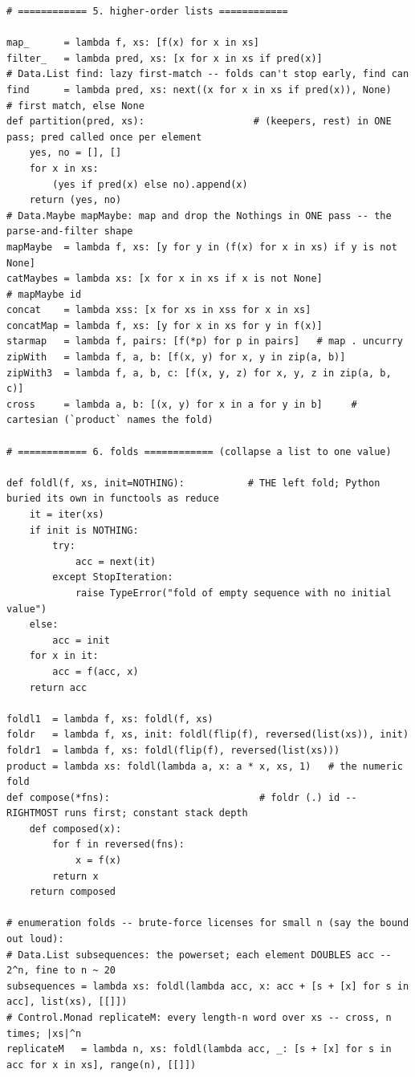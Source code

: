 \documentclass[11pt,letterpaper]{book}
\begin{document}
\begin{lstlisting}[style=file]
# ============ 5. higher-order lists ============

map_      = lambda f, xs: [f(x) for x in xs]
filter_   = lambda pred, xs: [x for x in xs if pred(x)]
# Data.List find: lazy first-match -- folds can't stop early, find can
find      = lambda pred, xs: next((x for x in xs if pred(x)), None)   # first match, else None
def partition(pred, xs):                   # (keepers, rest) in ONE pass; pred called once per element
    yes, no = [], []
    for x in xs:
        (yes if pred(x) else no).append(x)
    return (yes, no)
# Data.Maybe mapMaybe: map and drop the Nothings in ONE pass -- the parse-and-filter shape
mapMaybe  = lambda f, xs: [y for y in (f(x) for x in xs) if y is not None]
catMaybes = lambda xs: [x for x in xs if x is not None]                      # mapMaybe id
concat    = lambda xss: [x for xs in xss for x in xs]
concatMap = lambda f, xs: [y for x in xs for y in f(x)]
starmap   = lambda f, pairs: [f(*p) for p in pairs]   # map . uncurry
zipWith   = lambda f, a, b: [f(x, y) for x, y in zip(a, b)]
zipWith3  = lambda f, a, b, c: [f(x, y, z) for x, y, z in zip(a, b, c)]
cross     = lambda a, b: [(x, y) for x in a for y in b]     # cartesian (`product` names the fold)

# ============ 6. folds ============ (collapse a list to one value)

def foldl(f, xs, init=NOTHING):           # THE left fold; Python buried its own in functools as reduce
    it = iter(xs)
    if init is NOTHING:
        try:
            acc = next(it)
        except StopIteration:
            raise TypeError("fold of empty sequence with no initial value")
    else:
        acc = init
    for x in it:
        acc = f(acc, x)
    return acc

foldl1  = lambda f, xs: foldl(f, xs)
foldr   = lambda f, xs, init: foldl(flip(f), reversed(list(xs)), init)
foldr1  = lambda f, xs: foldl(flip(f), reversed(list(xs)))
product = lambda xs: foldl(lambda a, x: a * x, xs, 1)   # the numeric fold
def compose(*fns):                          # foldr (.) id -- RIGHTMOST runs first; constant stack depth
    def composed(x):
        for f in reversed(fns):
            x = f(x)
        return x
    return composed

# enumeration folds -- brute-force licenses for small n (say the bound out loud):
# Data.List subsequences: the powerset; each element DOUBLES acc -- 2^n, fine to n ~ 20
subsequences = lambda xs: foldl(lambda acc, x: acc + [s + [x] for s in acc], list(xs), [[]])
# Control.Monad replicateM: every length-n word over xs -- cross, n times; |xs|^n
replicateM   = lambda n, xs: foldl(lambda acc, _: [s + [x] for s in acc for x in xs], range(n), [[]])


\end{lstlisting}
\end{document}
